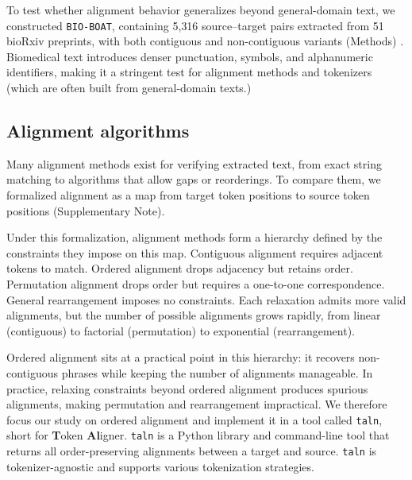 \documentclass[pdflatex,lineno,referee,sn-vancouver-num]{sn-jnl}
\theoremstyle{thmstyleone}
\theoremstyle{thmstylethree}
\theoremstyle{thmstyletwo}
\begin{document}
To test whether alignment behavior generalizes beyond general-domain text, we constructed \texttt{BIO-BOAT}, containing 5{,}316 source–target pairs extracted from 51 bioRxiv preprints, with both contiguous and non-contiguous variants (Methods) \citep{van_Vliet_2022,Cobo_L_pez_2023,Meyer_2023,Zimyanin_2023,Singer_2024,Shen_2024,Frolov_2024,Ryan_2024,Pfalzgraf_2024,Onishi_2024,Wondim_2024,Crnkovic_2024,Kallenborn_2024,Peroutka_Bigus_2024,Azim_2024,Bhalla_2024,Jones_2024,Fei_2024,Combredet_2024,Simmonds_2025,Adhinarta_2025,Elangovan_2025,Tang_2025,Maya_Miles_2025,Samame_Caramutti_2025,Nguyen_2025,Terstege_2025,Chen_2025_biorxiv,Li_2025,Kattner_2025,Shruti_2025,Vel_zquez_2025,Rull_2025,D_lker_2025,Keikhosravi_2025,Agazzi_2025,Choltus_2025,Maestro_2025,Widney_2025,Smith_2025,Mar_n_2025,Dadonaite_2025,Green_2025,S_lzen_2025,Pearce_2025,Biller_2025,Laub_2025,Johnson_2025,Na_2025,Tozzi_2025}. Biomedical text introduces denser punctuation, symbols, and alphanumeric identifiers, making it a stringent test for alignment methods and tokenizers (which are often built from general-domain texts.)

\subsection{Alignment algorithms}
Many alignment methods exist for verifying extracted text, from exact string matching to algorithms that allow gaps or reorderings. To compare them, we formalized alignment as a map from target token positions to source token positions (Supplementary Note).

Under this formalization, alignment methods form a hierarchy defined by the constraints they impose on this map. Contiguous alignment requires adjacent tokens to match. Ordered alignment drops adjacency but retains order. Permutation alignment drops order but requires a one-to-one correspondence. General rearrangement imposes no constraints. Each relaxation admits more valid alignments, but the number of possible alignments grows rapidly, from linear (contiguous) to factorial (permutation) to exponential (rearrangement).

Ordered alignment sits at a practical point in this hierarchy: it recovers non-contiguous phrases while keeping the number of alignments manageable. In practice, relaxing constraints beyond ordered alignment produces spurious alignments, making permutation and rearrangement impractical. We therefore focus our study on ordered alignment and implement it in a tool called \texttt{taln}, short for \textbf{T}oken \textbf{Al}igner. \texttt{taln} is a Python library and command-line tool that returns all order-preserving alignments between a target and source. \texttt{taln} is tokenizer-agnostic and supports various tokenization strategies. 
\end{document}

